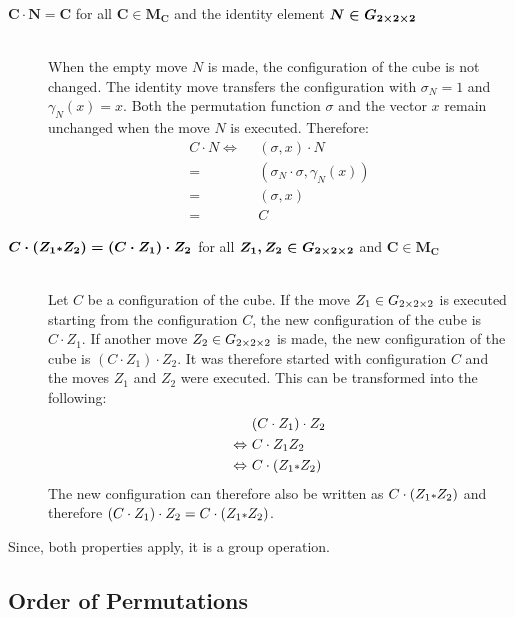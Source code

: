 \begin{description}
\item [$\boldsymbol{C \cdot N = C}$ for all $\boldsymbol{C \in M_C}$ and the identity element $\boldsymbol{N \in G_{2\times 2\times 2}}$]
\ \\
When the empty move $N$ is made, the configuration of the cube is not changed. The identity move transfers the configuration with $\sigma_N=1$ and $\gamma_N(x)=x$. Both the permutation function $\sigma$ and the vector $x$ remain unchanged when the move $N$ is executed. \newpage Therefore:
\begin{align*}
 C \cdot N
\Leftrightarrow \ \ & (\sigma, x) \cdot N \\
= \ \ & (\sigma_N \cdot \sigma, \gamma_N(x)) \\
= \ \ & (\sigma, x) \\
= \ \ & C
\end{align*}

\item [$\boldsymbol{C \cdot (Z_1 \mathlarger{\scriptstyle*} Z_2) = (C \cdot Z_1) \cdot Z_2}$ for all $\boldsymbol{Z_1, Z_2 \in G_{2\times 2\times 2}}$ and $\boldsymbol{C \in M_C}$]
\ \\
Let $C$ be a configuration of the cube. If the move $Z_1 \in G_{2\times 2\times 2}$ is executed starting from the configuration $C$, the new configuration of the cube is $C \cdot Z_1$. If another move $Z_2 \in G_{2\times 2\times 2}$ is made, the new configuration of the cube is $(C \cdot Z_1) \cdot Z_2$.
It was therefore started with configuration $C$ and the moves $Z_1$ and $Z_2$ were executed. This can be transformed into the following:
\begin{align*}
& (C \cdot Z_1) \cdot Z_2 \\
\Leftrightarrow \ & C \cdot Z_1Z_2 \\
\Leftrightarrow \ & C \cdot (Z_1 \mathlarger{\scriptstyle*} Z_2)
\end{align*}
The new configuration can therefore also be written as $C \cdot (Z_1 \mathlarger{\scriptstyle*} Z_2)$ and therefore $(C \cdot Z_1) \cdot Z_2 = C \cdot (Z_1 \mathlarger{\scriptstyle*} Z_2)$.
\end{description}
\nopagebreak
Since, both properties apply, it is a group operation. 

\subsection{Order of Permutations}

